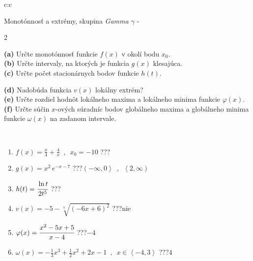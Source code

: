 \documentclass[10pt]{report}
\begin{document}
\newpage
\thispagestyle{empty}
\begin{tabular}{c:c}
\begin{minipage}[c][104.5mm][t]{0.5\linewidth}
\begin{center}
\vspace{7mm}
{\huge Monotónnosť a extrémy, skupina \textit{Gamma $\gamma$} -}\\[5mm]
\begin{minipage}{0.95\linewidth}
\begin{center}
{\small \begin{multicols}{2} \raggedright
\textbf{(a)} Určte monotónnosť funkcie \(f(x)\) v okolí bodu \(x_0\). \\[1mm]
\textbf{(b)} Určte intervaly, na ktorých je funkcia \(g(x)\) klesajúca. \\[1mm]
\textbf{(c)} Určte počet stacionárnych bodov funkcie \(h(t)\). \par \columnbreak
\textbf{(d)} Nadobúda funkcia \(v(x)\) lokálny extrém? \\[1mm]
\textbf{(e)} Určte rozdiel hodnôt lokálneho maxima a lokálneho minima funkcie \(\varphi(x)\). \\[1mm]
\textbf{(f)} Určte súčin \(x\)-ových súradníc bodov globálneho maxima a globálneho minima funkcie \(\omega(x)\) na zadanom intervale. \\[1mm]
\end{multicols}
}
\end{center}
\end{minipage}
\\[4mm]
\begin{minipage}{0.79\linewidth}
\begin{center}
\begin{varwidth}{\linewidth}
\begin{enumerate}
\normalsize
\item $f(x)=\frac{x}{4}+\frac{4}{x} \enspace , \enspace x_0=-10$\quad \dotfill\; ???\;\dotfill \quad {}
\item $g(x)=x^2\, e^{-x-7}$\quad \dotfill\; ???\;\dotfill \quad $\left(-\infty , 0\right\rangle\enspace , \enspace \left\langle2 , \infty\right)$
\item $h(t)=\cfrac{\ln t}{2t^5}$\quad \dotfill\; ???\;\dotfill {}
\item $v(x)=-5-\sqrt[7]{(-6x+6)^2}$\quad \dotfill\; ???\;\dotfill \quad $\text{nie}$
\item $\varphi(x)=\cfrac{x^2-5x+5}{x-4}$\quad \dotfill\; ???\;\dotfill \quad $-4$
\item $\omega(x)=-\frac{1}{3}x^3+\frac{1}{2}x^2+2x-1 \enspace , \enspace x\in\left\langle-4 , 3\right\rangle$\quad \dotfill\; ???\;\dotfill \quad $4$

\end{enumerate}
\end{varwidth}
\end{center}
\end{minipage}
\end{center}
\end{minipage}
\end{tabular}
\end{document}
